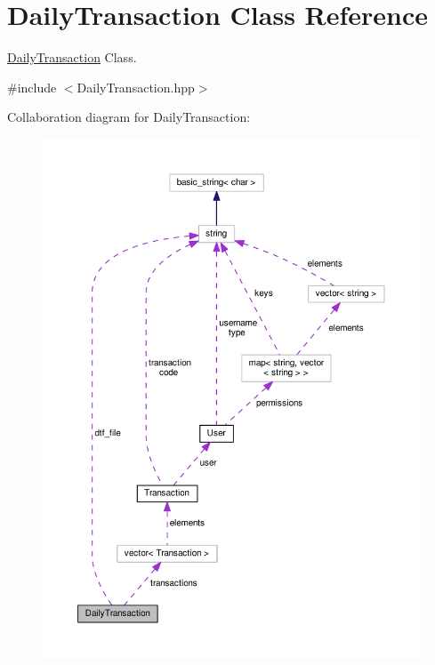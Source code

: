 \hypertarget{class_daily_transaction}{\section{Daily\-Transaction Class Reference}
\label{class_daily_transaction}
}


\hyperlink{class_daily_transaction}{Daily\-Transaction} Class.  




{\ttfamily \#include $<$Daily\-Transaction.\-hpp$>$}



Collaboration diagram for Daily\-Transaction\-:
\nopagebreak
\begin{figure}[H]
\begin{center}
\leavevmode
\includegraphics[width=350pt]{class_daily_transaction__coll__graph}
\end{center}
\end{figure}
